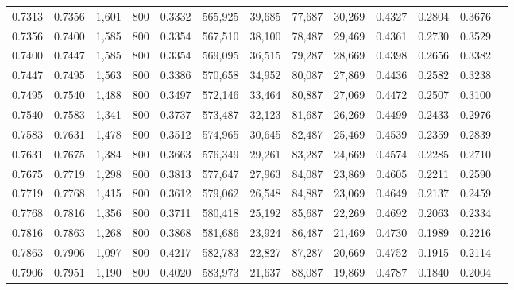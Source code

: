 \begin{tabular}{rrrrrrrrrrrrr}
0.7313 & 0.7356 &  1,601 &   800 &                                     0.3332 & 565,925 &  39,685 &  77,687 &  30,269 & 0.4327 & 0.2804 & 0.3676 \\
0.7356 & 0.7400 &  1,585 &   800 &                                     0.3354 & 567,510 &  38,100 &  78,487 &  29,469 & 0.4361 & 0.2730 & 0.3529 \\
0.7400 & 0.7447 &  1,585 &   800 &                                     0.3354 & 569,095 &  36,515 &  79,287 &  28,669 & 0.4398 & 0.2656 & 0.3382 \\
0.7447 & 0.7495 &  1,563 &   800 &                                     0.3386 & 570,658 &  34,952 &  80,087 &  27,869 & 0.4436 & 0.2582 & 0.3238 \\
0.7495 & 0.7540 &  1,488 &   800 &                                     0.3497 & 572,146 &  33,464 &  80,887 &  27,069 & 0.4472 & 0.2507 & 0.3100 \\
0.7540 & 0.7583 &  1,341 &   800 &                                     0.3737 & 573,487 &  32,123 &  81,687 &  26,269 & 0.4499 & 0.2433 & 0.2976 \\
0.7583 & 0.7631 &  1,478 &   800 &                                     0.3512 & 574,965 &  30,645 &  82,487 &  25,469 & 0.4539 & 0.2359 & 0.2839 \\
0.7631 & 0.7675 &  1,384 &   800 &                                     0.3663 & 576,349 &  29,261 &  83,287 &  24,669 & 0.4574 & 0.2285 & 0.2710 \\
0.7675 & 0.7719 &  1,298 &   800 &                                     0.3813 & 577,647 &  27,963 &  84,087 &  23,869 & 0.4605 & 0.2211 & 0.2590 \\
0.7719 & 0.7768 &  1,415 &   800 &                                     0.3612 & 579,062 &  26,548 &  84,887 &  23,069 & 0.4649 & 0.2137 & 0.2459 \\
0.7768 & 0.7816 &  1,356 &   800 &                                     0.3711 & 580,418 &  25,192 &  85,687 &  22,269 & 0.4692 & 0.2063 & 0.2334 \\
0.7816 & 0.7863 &  1,268 &   800 &                                     0.3868 & 581,686 &  23,924 &  86,487 &  21,469 & 0.4730 & 0.1989 & 0.2216 \\
0.7863 & 0.7906 &  1,097 &   800 &                                     0.4217 & 582,783 &  22,827 &  87,287 &  20,669 & 0.4752 & 0.1915 & 0.2114 \\
0.7906 & 0.7951 &  1,190 &   800 &                                     0.4020 & 583,973 &  21,637 &  88,087 &  19,869 & 0.4787 & 0.1840 & 0.2004 \\

\end{tabular}
